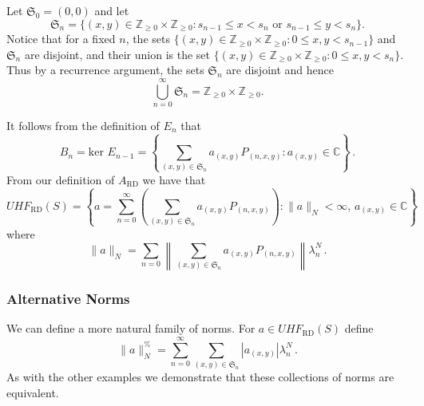 \documentclass[12pt,reqno]{amsart}
\numberwithin{equation}{section}
\newcommand{\C}{{\mathbb C}}
\newcommand{\Z}{{\mathbb Z}}
\begin{document}
Let $\mathfrak{S}_0=(0,0)$ and let 
$$\mathfrak{S}_n=\{(x,y)\in \Z_{\geq 0}\times \Z_{\geq 0}: s_{n-1}\le x<s_n\textrm{ or }s_{n-1}\le y<s_n\}.$$
Notice that for a fixed $n$, the sets $\{(x,y)\in \Z_{\geq 0}\times \Z_{\geq 0}: 0\le x,y<s_{n-1}\}$ and $\mathfrak{S}_n$ are disjoint, and their union is the set $\{(x,y)\in \Z_{\geq 0}\times \Z_{\geq 0}: 0\le x,y<s_{n}\}$. Thus by a recurrence argument, the sets  $\mathfrak{S}_n$ are disjoint and hence \begin{equation*}
\bigcup_{n=0}^\infty \mathfrak{S}_n=\Z_{\geq 0}\times \Z_{\geq 0}.
\end{equation*}

It follows from the definition of $E_n$ that
\begin{equation*}
B_n = \textrm{ker }E_{n-1} = \left\{\sum_{(x,y)\in\mathfrak{S}_n} a_{(x,y)} P_{(n,x,y)}:a_{(x,y)}\in\C\right\}\,.
\end{equation*}
From our definition of $A_{\textrm{RD}}$ we have that
\begin{equation*}
UHF_{\textrm{RD}}(S)=\left\{a=\sum_{n=0}^\infty\left(\sum_{(x,y)\in\mathfrak{S}_n}a_{(x,y)}P_{(n,x,y)}\right): \|a\|_N<\infty,\,a_{(x,y)}\in\C\right\}
\end{equation*}
where
\begin{equation*}
\|a\|_N=\sum_{n=0}\left\|\sum_{(x,y)\in\mathfrak{S}_n}a_{(x,y)}P_{(n,x,y)}\right\|\lambda_n^N\,.
\end{equation*}

\subsubsection{Alternative Norms}
We can define a more natural family of norms.  For $a\in UHF_{\textrm{RD}}(S)$ define
\begin{equation*}
\|a\|_N^\% = \sum_{n=0}^\infty \sum_{(x,y)\in\mathfrak{S}_n}|a_{(x,y)}|\lambda_n^N\,.
\end{equation*}
As with the other examples we demonstrate that these collections of norms are equivalent.
\end{document}
